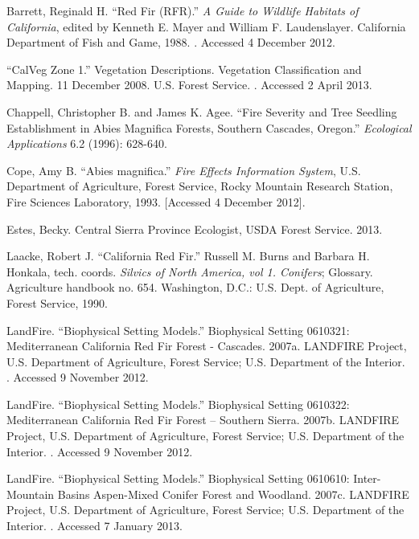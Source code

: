 \begin{hangparas}{.25in}{1} 
Barrett, Reginald H. ``Red Fir (RFR).'' \emph{A Guide to Wildlife Habitats of California}, edited by Kenneth E. Mayer and William F. Laudenslayer. California Department of Fish and Game, 1988. . Accessed 4 December 2012.

``CalVeg Zone 1.'' Vegetation Descriptions. Vegetation Classification and Mapping.  11 December 2008. U.S. Forest Service. . Accessed 2 April 2013.

Chappell, Christopher B. and James K. Agee. ``Fire Severity and Tree Seedling Establishment in Abies Magnifica Forests, Southern Cascades, Oregon.'' \emph{Ecological Applications} 6.2 (1996): 628-640.

Cope, Amy B. ``Abies magnifica.'' \emph{Fire Effects Information System}, U.S. Department of Agriculture, Forest Service,  Rocky Mountain Research Station, Fire Sciences Laboratory, 1993.  [Accessed 4 December 2012].

Estes, Becky. Central Sierra Province Ecologist, USDA Forest Service. 2013.

Laacke, Robert J. ``California Red Fir.'' Russell M. Burns and Barbara H. Honkala, tech. coords. \emph{Silvics of North America, vol 1. Conifers}; Glossary. Agriculture handbook no. 654. Washington, D.C.: U.S. Dept. of Agriculture, Forest Service, 1990. 

LandFire. ``Biophysical Setting Models.'' Biophysical Setting 0610321: Mediterranean California Red Fir Forest - Cascades. 2007a. LANDFIRE Project, U.S. Department of Agriculture, Forest Service; U.S. Department of the Interior. . Accessed 9 November 2012.

LandFire. ``Biophysical Setting Models.'' Biophysical Setting 0610322: Mediterranean California Red Fir Forest – Southern Sierra. 2007b. LANDFIRE Project, U.S. Department of Agriculture, Forest Service; U.S. Department of the Interior. . Accessed 9 November 2012.

LandFire. ``Biophysical Setting Models.'' Biophysical Setting 0610610: Inter-Mountain Basins Aspen-Mixed Conifer Forest and Woodland. 2007c. LANDFIRE Project, U.S. Department of Agriculture, Forest Service; U.S. Department of the Interior. . Accessed 7 January 2013.


\end{hangparas}
